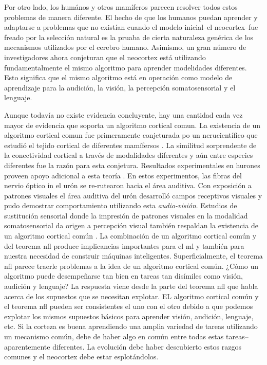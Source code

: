Por otro lado, los humános y otros mamíferos parecen resolver todos estos problemas de manera diferente.
El hecho de que los humanos puedan aprender y adaptarse a problemas que no existían
cuando el modelo inicial--el neocortex--fue freado por la selección natural
es la pruaba de cierta naturaleza genérica de los mecanismos utilizados por el cerebro humano.
Asimismo, un gran número de investigadores ahora conjeturan que el neocortex está utilizando fundamentalmente el mismo algoritmo
para aprender modelidades diferentes.
Esto significa que el mismo algoritmo está en operación como modelo de aprendizaje para la audición, la visión, la percepción somatosensorial
y el lenguaje.

Aunque todavía no existe evidencia concluyente, hay una cantidad cada vez mayor de evidencia que soporta un algoritmo cortical comun.
La existencia de un algoritmo cortical comun fue primeramente conjeturada po un nerucientífico que estudió el tejido cortical de diferentes mamífersos \cite{mountcastle_1978}.
La similitud sorprendente de la conectividad cortical a través de modalidades diferentes
y aún entre especies diferentes fue la razón para esta conjetura.
Resultados experimentales en hurones proveen apoyo adicional a esta teoría \cite{von2000visual}.
En estos experimentos, las fibras del nervio óptico in el urón se re-rutearon hacia el área auditiva.
Con exposición a patrones visuales el área auditiva del urón desarrolló campos receptivos visuales
y pudo demostrar comportamiento utilizando esta \emph{audio-visión}.
Estudios de sustitución sensorial donde la impresión de patrones visuales en la modalidad somatosensorial
da origen a percepción visual también respaldan la existencia de un algoritmo cortical común \cite{doi:10.1196/annals.1305.006,BachyRita2003SensorySA}.
La combinación de un algoritmo cortical común y del teorema \gls{nfl} produce implicancias importantes para el \gls{ml}
y también para nuestra necesidad de construir máquinas inteligentes.
Superficialmente, el teorema \gls{nfl} parece traerle problemas a la idea de un algoritmo cortical común.
¿Cómo un algoritmo puede desempeñarse tan bien en tareas tan disímiles como
visión, audición y lenguaje?
La respuesta viene desde la parte del teorema \gls{nfl} que habla acerca de los supuestos que se necesitan explotar.
EL algoritmo cortical común y el teorema \gls{nfl} pueden ser consistentes el uno con el otro
debido a que podemos explotar los mismos supuestos básicos para aprender visión, audición,
lenguaje, etc.
Si la corteza es buena aprendiendo una amplia variedad de tareas utilizando un mecanismo común,
debe de haber algo en común entre todas estas tareas--aparentemente diferentes.
La evolución debe haber descubierto estos razgos comunes y el neocortex debe estar esplotándolos. 

